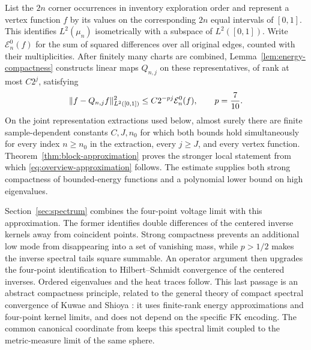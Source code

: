 List the \(2n\) corner occurrences in inventory exploration order and
represent a vertex function \(f\) by its values on the corresponding \(2n\)
equal intervals of \([0,1]\).  This identifies \(L^2(\mu_n)\) isometrically with a subspace of
\(L^2([0,1])\).  Write \(\mathcal E_n^0(f)\) for the sum of squared differences
over all original edges, counted with their multiplicities.  After finitely
many charts are combined, Lemma~\ref{lem:energy-compactness} constructs
linear maps \(Q_{n,j}\) on these representatives, of rank at most \(C2^j\),
satisfying
\begin{equation}\label{eq:overview-approximation}
 \lVert f-Q_{n,j}f\rVert_{L^2([0,1])}^2
 \le C2^{-pj}\mathcal E_n^0(f),\qquad p=\frac7{10}.
\end{equation}
On the joint representation extractions used below, almost surely there are
finite sample-dependent constants \(C,J,n_0\) for which both bounds hold
simultaneously for every index \(n\ge n_0\) in the extraction, every
\(j\ge J\), and every vertex function.  Theorem~\ref{thm:block-approximation}
proves the stronger local statement from which
\eqref{eq:overview-approximation} follows.  The estimate supplies both
strong compactness of bounded-energy functions and a polynomial lower bound
on high eigenvalues.

Section~\ref{sec:spectrum} combines the four-point voltage limit with this
approximation.  The former identifies double differences of the centered
inverse kernels away from coincident points.  Strong compactness prevents
an additional low mode from disappearing into a set of
vanishing mass, while \(p>1/2\) makes the inverse spectral tails square
summable.  An operator argument then upgrades the four-point identification
to Hilbert--Schmidt convergence of the centered inverses.  Ordered
eigenvalues and the heat traces follow.  This last passage is an abstract
compactness principle, related to the general theory of compact spectral
convergence of Kuwae and Shioya \cite{KuwaeShioya2003}: it uses finite-rank
energy approximations and four-point kernel limits, and does not depend on
the specific FK encoding.
The common canonical coordinate from \cite{C} keeps this spectral limit
coupled to the metric-measure limit of the same sphere.
